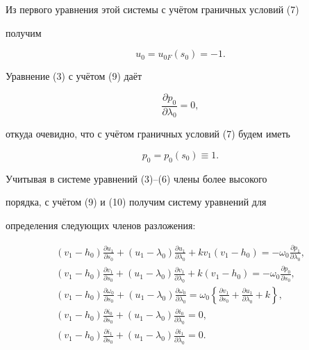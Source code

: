 Из первого уравнения этой системы с учётом граничных условий (7)


получим


\begin{equation}


u_0 = u_{0F}(s_0) = - 1.


\end{equation}





Уравнение (3) с учётом (9) даёт


\[


\frac{\partial p_0}{\partial \lambda_0} = 0,


\]


откуда очевидно,  что с учётом граничных условий (7) будем иметь


\begin{equation}


p_0 = p_0(s_0) \equiv 1.


\end{equation}





Учитывая в системе уравнений (3)--(6) члены более высокого


порядка,  с учётом (9) и (10) получим систему уравнений для


определения следующих членов разложения:


\begin{gather}


(v_1 - h_0)\frac{\partial u_1}{\partial


s_0}+(u_1-\lambda_0)\frac{\partial u_1}{\partial


\lambda_0}+k v_1 (v_1-h_0) =-\omega_0\frac{\partial


p_1}{\partial \lambda_0},\\


(v_1 - h_0) \frac{\partial v_1}{\partial


s_0} + (u_1 - \lambda_0) \frac{\partial v_1}{\partial


\lambda_0}  +k (v_1-h_0) = - \omega_0 \frac{\partial


p_0}{\partial s_0},\\


(v_1 - h_0) \frac{\partial \omega_0}{\partial


s_0} + (u_1 - \lambda_0)  \frac{\partial \omega_0}{\partial


\lambda_0} =  \omega_0 \left\{\frac{\partial v_1}{\partial


s_0} +  \frac{\partial u_1}{\partial \lambda_0} + k\right\},\\


(v_1 - h_0) \frac{\partial i_0}{\partial


s_0} + (u_1 - \lambda_0)  \frac{\partial i_0}{\partial


\lambda_0} = 0,\\


(v_1 - h_0) \frac{\partial i_1}{\partial


s_0} + (u_1 - \lambda_0)  \frac{\partial i_1}{\partial


\lambda_0} = 0.


\end{gather}


